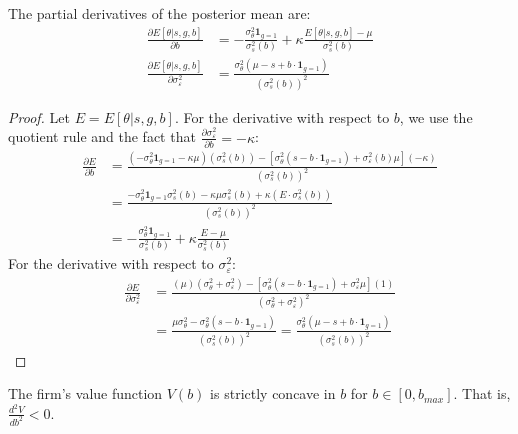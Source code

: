 \begin{lemma}\label{lemma:posterior_derivatives}
The partial derivatives of the posterior mean are:
\begin{align}
\frac{\partial E[\theta | s, g, b]}{\partial b} &= -\frac{\sigma_\theta^2 \mathbf{1}_{g=1}}{\sigma_s^2(b)} + \kappa \frac{E[\theta|s,g,b] - \mu}{\sigma_s^2(b)} \\
\frac{\partial E[\theta | s, g, b]}{\partial \sigma_\varepsilon^2} &= \frac{\sigma_\theta^2(\mu - s + b \cdot \mathbf{1}_{g=1})}{(\sigma_s^2(b))^2}
\end{align}
\end{lemma}

\begin{proof}
Let $E = E[\theta | s, g, b]$. For the derivative with respect to $b$, we use the quotient rule and the fact that $\frac{\partial \sigma_\varepsilon^2}{\partial b} = -\kappa$:
\begin{align}
\frac{\partial E}{\partial b} &= \frac{(-\sigma_\theta^2 \mathbf{1}_{g=1} - \kappa \mu)(\sigma_s^2(b)) - [\sigma_\theta^2 (s - b \cdot \mathbf{1}_{g=1}) + \sigma_\varepsilon^2(b) \mu](-\kappa)}{(\sigma_s^2(b))^2} \\
&= \frac{-\sigma_\theta^2 \mathbf{1}_{g=1}\sigma_s^2(b) - \kappa \mu \sigma_s^2(b) + \kappa (E \cdot \sigma_s^2(b))}{(\sigma_s^2(b))^2} \\
&= -\frac{\sigma_\theta^2 \mathbf{1}_{g=1}}{\sigma_s^2(b)} + \kappa \frac{E - \mu}{\sigma_s^2(b)}
\end{align}
For the derivative with respect to $\sigma_\varepsilon^2$:
\begin{align}
\frac{\partial E}{\partial \sigma_\varepsilon^2} &= \frac{(\mu)(\sigma_\theta^2 + \sigma_\varepsilon^2) - [\sigma_\theta^2 (s - b \cdot \mathbf{1}_{g=1}) + \sigma_\varepsilon^2 \mu](1)}{(\sigma_\theta^2 + \sigma_\varepsilon^2)^2} \\
&= \frac{\mu \sigma_\theta^2 - \sigma_\theta^2 (s - b \cdot \mathbf{1}_{g=1})}{(\sigma_s^2(b))^2} = \frac{\sigma_\theta^2(\mu - s + b \cdot \mathbf{1}_{g=1})}{(\sigma_s^2(b))^2}
\end{align}
\end{proof}

\begin{lemma}
    \label{lemma:concavity}
    The firm's value function $V(b)$ is strictly concave in $b$ for $b \in [0, b_{max}]$. That is, $\frac{d^2V}{db^2} < 0$.
\end{lemma}

